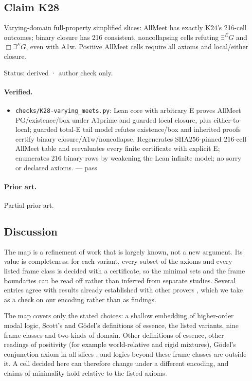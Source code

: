 \documentclass{article}
\begin{document}
\subsection*{Claim K28}

Varying-domain full-property simplified slices: AllMeet has exactly K24’s 216-cell outcomes; binary closure has 216 consistent, noncollapsing cells refuting $\exists^E G$ and $\Box\exists^E G$, even with A1w. Positive AllMeet cells require all axioms and local/either closure.

Status: derived · author check only.

\paragraph{Verified.}
\begin{itemize}
\item \texttt{checks/K28-varying\_meets.py}: Lean core with arbitrary E proves AllMeet PG/existence/box under A1prime and guarded local closure, plus either-to-local; guarded total-E tail model refutes existence/box and inherited proofs certify binary closure/A1w/noncollapse. Regenerates SHA256-pinned 216-cell AllMeet table and reevaluates every finite certificate with explicit E; enumerates 216 binary rows by weakening the Lean infinite model; no sorry or declared axioms. --- pass
\end{itemize}

\paragraph{Prior art.} Partial prior art.

\subsection*{Discussion}

The map is a refinement of work that is largely known, not a new argument. Its value is
completeness: for each variant, every subset of the axioms and every listed frame class is decided
with a certificate, so the minimal sets and the frame boundaries can be read off rather than
inferred from separate studies. Several entries agree with results already established with
other provers \cite{benzmueller2025notes,benzmueller2026lean,benzmueller2017hajek}, which we take
as a check on our encoding rather than as findings.

The map covers only the stated choices: a shallow embedding of higher-order modal logic, Scott's
and Gödel's definitions of essence, the listed variants, nine frame classes and two kinds of
domain. Other definitions of essence, other readings of positivity (for example world-relative
and rigid mixtures), Gödel's conjunction axiom in all slices \cite{benzmueller2026ultrafilters}, and
logics beyond these frame classes are outside it. A cell decided here can therefore change under
a different encoding, and claims of minimality hold relative to the listed axioms.
\end{document}
